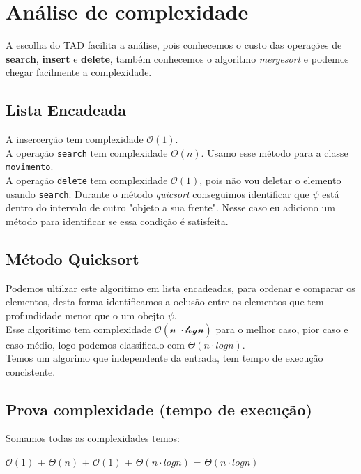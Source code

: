 \documentclass[12pt]{article}
\begin{document}
 	\section{Análise de complexidade}
 	A escolha do TAD facilita a análise, pois conhecemos o custo das operações de \textbf{search}, \textbf{insert} e \textbf{delete}, também conhecemos o algoritmo \textit{mergesort} e podemos chegar facilmente a complexidade.
 	
 	\subsection{Lista Encadeada}
 	A insercerção tem complexidade $\mathcal{O(\text{1})}$.\\
 	
 	A operação \texttt{search} tem complexidade $\Theta(n)$. Usamo esse método para a classe \texttt{movimento}.\\
 	
 	A operação \texttt{delete} tem complexidade $\mathcal{O(\text{1})}$, pois não vou deletar o elemento usando \texttt{search}. Durante o método \textit{quicsort} conseguimos identificar que $\psi$ está dentro do intervalo de outro "objeto a sua frente". Nesse caso eu adiciono um método para identificar se essa condição é satisfeita.
 	
 	\subsection{Método Quicksort}
 	Podemos ultilzar este algoritimo em lista encadeadas, para ordenar e comparar os elementos, desta forma  identificamos a oclusão entre os elementos que tem profundidade menor que o um obejto $\psi$.\\
 	
 	Esse algoritimo tem complexidade  $\mathcal{O(\text{n $\cdot$logn})}$ para o melhor caso, pior caso e caso médio, logo podemos classificalo com $\Theta(n \cdot logn)$. \\
 	
 	Temos um algorimo que independente da entrada, tem tempo de execução concistente.
 	
 	
 	\subsection{Prova complexidade (tempo de execução)}
 	Somamos todas as complexidades temos:
 	
 	\begin{center}
 		$\mathcal{O(\text{1})}$ + $\Theta(n)$ + $\mathcal{O(\text{1})}$ + $\Theta(n \cdot logn)$ = $\Theta(n \cdot logn)$
 	\end{center}
 	
\end{document}
